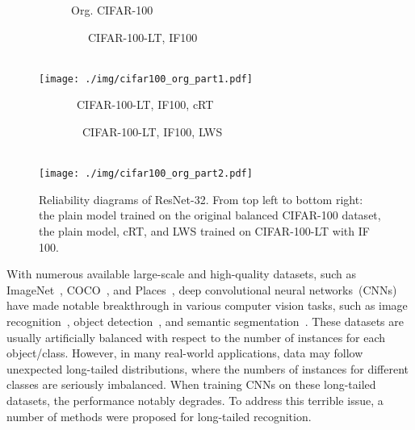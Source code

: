\documentclass[final]{cvpr}
\begin{document}
	\begin{figure}[t]
		\vspace{18pt}
		\centering
		\begin{subfigure}{0.48\linewidth}
			\centering
			{\small{\quad\quad\quad  Org. CIFAR-100}}
		\end{subfigure} 
		\hfill
		\begin{subfigure}{0.48\linewidth}
			\centering
			{\small \ \ \  CIFAR-100-LT, IF100}
		\end{subfigure} \\
		\vspace{3pt}
		\texttt{[image: ./img/cifar100\_org\_part1.pdf]} 
		\begin{subfigure}{0.5\linewidth}
			\centering
			{\small{\quad\quad\ CIFAR-100-LT, IF100, cRT}}
		\end{subfigure} 
		\hfill
		\begin{subfigure}{0.48\linewidth}
			\centering
			{\small \ \ CIFAR-100-LT, IF100, LWS}
		\end{subfigure} \\
		\vspace{3pt}
		\texttt{[image: ./img/cifar100\_org\_part2.pdf]} 
		\vspace{-18pt}
		\caption{Reliability diagrams of ResNet-32. From top left to bottom right: the plain model trained on the original balanced CIFAR-100 dataset, the plain model, cRT, and LWS trained on CIFAR-100-LT with IF 100.}
		\vspace{-20pt}
		\label{fig:overcondifence}
	\end{figure}
	


	With numerous available large-scale and high-quality datasets, such as ImageNet~\cite{imagenet}, COCO~\cite{coco}, and Places~\cite{places}, deep convolutional neural networks~(CNNs) have made notable breakthrough in various computer vision tasks, such as image recognition~\cite{alexnet, resnet}, object detection~\cite{fasterrcnn}, and semantic segmentation~\cite{cordts2016cityscapes}. These datasets are usually artificially balanced with respect to the number of instances for each object/class. However, in many real-world applications, data may follow unexpected long-tailed distributions, where the numbers of instances for different classes are seriously imbalanced. When training CNNs on these long-tailed datasets, the performance notably degrades. To address this terrible issue, a number of methods were proposed for long-tailed recognition.
	
\end{document}
